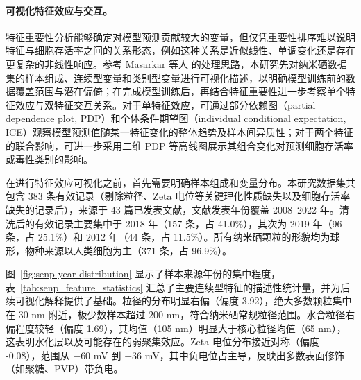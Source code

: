 \paragraph{可视化特征效应与交互。}
特征重要性分析能够确定对模型预测贡献较大的变量，但仅凭重要性排序难以说明特征与细胞存活率之间的关系形态，例如这种关系是近似线性、单调变化还是存在更复杂的非线性响应。参考 Masarkar 等人 \cite{masarkar2024} 的处理思路，本研究先对纳米硒数据集的样本组成、连续型变量和类别型变量进行可视化描述，以明确模型训练前的数据覆盖范围与潜在偏倚；在完成模型训练后，再结合特征重要性进一步考察单个特征效应与双特征交互关系。对于单特征效应，可通过部分依赖图（partial dependence plot, PDP）和个体条件期望图（individual conditional expectation, ICE）观察模型预测值随某一特征变化的整体趋势及样本间异质性；对于两个特征的联合影响，可进一步采用二维 PDP 等高线图展示其组合变化对预测细胞存活率或毒性类别的影响。

在进行特征效应可视化之前，首先需要明确样本组成和变量分布。本研究数据集共包含 383 条有效记录（剔除粒径、Zeta 电位等关键理化性质缺失以及细胞存活率缺失的记录后），来源于 43 篇已发表文献，文献发表年份覆盖 2008--2022 年。清洗后的有效记录主要集中于 2018 年（157 条，占 41.0\%），其次为 2019 年（96 条，占 25.1\%）和 2012 年（44 条，占 11.5\%）。所有纳米硒颗粒的形貌均为球形，物种来源以人类细胞为主（371 条，占 96.9\%）。

图~\ref{fig:senp-year-distribution} 显示了样本来源年份的集中程度，表~\ref{tab:senp_feature_statistics} 汇总了主要连续型特征的描述性统计量，并为后续可视化解释提供了基础。粒径的分布明显右偏（偏度 3.92），绝大多数颗粒集中在 30 nm 附近，极少数样本超过 200 nm，符合纳米硒常规粒径范围。水合粒径右偏程度较轻（偏度 1.69），其均值（105 nm）明显大于核心粒径均值（65 nm），这表明水化层以及可能存在的弱聚集效应。Zeta 电位分布接近对称（偏度 -0.08），范围从 $-60$ mV 到 $+36$ mV，其中负电位占主导，反映出多数表面修饰（如聚糖、PVP）带负电。

